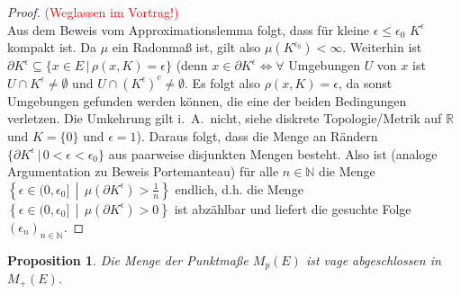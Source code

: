 \documentclass[twoside]{article}
\newtheorem{proposition}[theorem]{Proposition}
\theoremstyle{definition}
\begin{document}
\begin{proof} \textcolor{red}{(Weglassen im Vortrag!)}\\
Aus dem Beweis vom Approximationslemma folgt, dass für kleine $\epsilon \leq \epsilon_0$ $K^\epsilon$ kompakt ist. Da $\mu$ ein Radonmaß ist, gilt also $\mu(K^{\epsilon_0}) < \infty$. Weiterhin ist $\partial K^\epsilon \subseteq \{x \in E \, | \, \rho(x,K)=\epsilon \}$ (denn $x \in \partial K^\epsilon \Leftrightarrow \forall$ Umgebungen $U$ von $x$ ist $U \cap K^\epsilon \neq \emptyset$ und $U \cap \left(K^\epsilon\right)^c \neq \emptyset$. Es folgt also $\rho(x,K) = \epsilon$, da sonst Umgebungen gefunden werden können, die eine der beiden Bedingungen verletzen. Die Umkehrung gilt i.\ A.\ nicht, siehe diskrete Topologie/Metrik auf $\mathbb{R}$ und $K = \{0\}$ und $\epsilon = 1$). Daraus folgt, dass die Menge an Rändern $\{\partial K^\epsilon \, | \, 0 < \epsilon < \epsilon_0 \}$ aus paarweise disjunkten Mengen besteht. Also ist (analoge Argumentation zu Beweis Portemanteau) für alle $n \in \mathbb{N}$ die Menge $\left\{\epsilon \in (0,\epsilon_0] \, \middle| \, \mu \left(\partial K^\epsilon \right) > \frac{1}{n} \right\}$ endlich, d.h. die Menge $\left\{\epsilon \in (0,\epsilon_0] \, \middle| \, \mu \left( \partial K^\epsilon\right)>0 \right\}$ ist abzählbar und liefert die gesuchte Folge $(\epsilon_n)_{n \in \mathbb{N}}$.
\end{proof}
\begin{proposition} 
Die Menge der Punktmaße $M_p(E)$ ist vage abgeschlossen in  $M_+(E)$.
\end{proposition}
\end{document}
